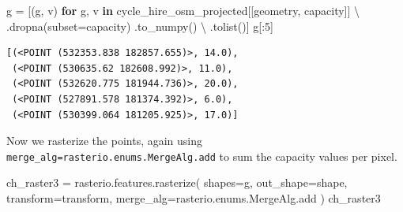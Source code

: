 \documentclass[
  letterpaper,
]{krantz}
\newenvironment{Shaded}{\begin{snugshade}}{\end{snugshade}}
\newcommand{\ControlFlowTok}[1]{\textcolor[rgb]{0.00,0.23,0.31}{\textbf{#1}}}
\newcommand{\DecValTok}[1]{\textcolor[rgb]{0.68,0.00,0.00}{#1}}
\newcommand{\KeywordTok}[1]{\textcolor[rgb]{0.00,0.23,0.31}{\textbf{#1}}}
\newcommand{\NormalTok}[1]{\textcolor[rgb]{0.00,0.23,0.31}{#1}}
\newcommand{\OperatorTok}[1]{\textcolor[rgb]{0.37,0.37,0.37}{#1}}
\newcommand{\StringTok}[1]{\textcolor[rgb]{0.13,0.47,0.30}{#1}}
\begin{document}
\begin{Shaded}
\begin{Highlighting}[]
\NormalTok{g }\OperatorTok{=}\NormalTok{ [(g, v) }\ControlFlowTok{for}\NormalTok{ g, v }\KeywordTok{in}\NormalTok{ cycle\_hire\_osm\_projected[[}\StringTok{\textquotesingle{}geometry\textquotesingle{}}\NormalTok{, }\StringTok{\textquotesingle{}capacity\textquotesingle{}}\NormalTok{]] }\OperatorTok{\textbackslash{}}
\NormalTok{        .dropna(subset}\OperatorTok{=}\StringTok{\textquotesingle{}capacity\textquotesingle{}}\NormalTok{)}
\NormalTok{        .to\_numpy() }\OperatorTok{\textbackslash{}}
\NormalTok{        .tolist()]}
\NormalTok{g[:}\DecValTok{5}\NormalTok{]}
\end{Highlighting}
\end{Shaded}

\begin{verbatim}
[(<POINT (532353.838 182857.655)>, 14.0),
 (<POINT (530635.62 182608.992)>, 11.0),
 (<POINT (532620.775 181944.736)>, 20.0),
 (<POINT (527891.578 181374.392)>, 6.0),
 (<POINT (530399.064 181205.925)>, 17.0)]
\end{verbatim}

Now we rasterize the points, again using
\texttt{merge\_alg=rasterio.enums.MergeAlg.add} to sum the capacity
values per pixel.

\begin{Shaded}
\begin{Highlighting}[]
\NormalTok{ch\_raster3 }\OperatorTok{=}\NormalTok{ rasterio.features.rasterize(}
\NormalTok{    shapes}\OperatorTok{=}\NormalTok{g,}
\NormalTok{    out\_shape}\OperatorTok{=}\NormalTok{shape,}
\NormalTok{    transform}\OperatorTok{=}\NormalTok{transform,}
\NormalTok{    merge\_alg}\OperatorTok{=}\NormalTok{rasterio.enums.MergeAlg.add}
\NormalTok{)}
\NormalTok{ch\_raster3}
\end{Highlighting}
\end{Shaded}
\end{document}

